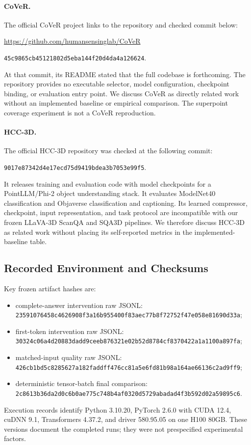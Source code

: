 \paragraph{CoVeR.} The official CoVeR project links to the repository and checked commit below:
{\raggedright\par\noindent
\url{https://github.com/humansensinglab/CoVeR}\par\noindent
\texttt{45c9865cb45121802d5e\allowbreak ba144f20d4da4a126624}.\par}
At that commit, its README stated that the full codebase is forthcoming. The repository provides no executable selector, model configuration, checkpoint binding, or evaluation entry point. We discuss CoVeR as directly related work without an implemented baseline or empirical comparison. The superpoint coverage experiment is not a CoVeR reproduction.

\paragraph{HCC-3D.} The official HCC-3D repository was checked at the following commit:
{\raggedright\par\noindent
\texttt{9017e87342d4e17ecd75\allowbreak d9419bdea3b7053e99f5}.\par}
It releases training and evaluation code with model checkpoints for a PointLLM/Phi-2 object understanding stack. It evaluates ModelNet40 classification and Objaverse classification and captioning. Its learned compressor, checkpoint, input representation, and task protocol are incompatible with our frozen LLaVA-3D ScanQA and SQA3D pipelines. We therefore discuss HCC-3D as related work without placing its self-reported metrics in the implemented-baseline table.

\subsection{Recorded Environment and Checksums}
Key frozen artifact hashes are:

\begin{itemize}
\item complete-answer intervention raw JSONL: \texttt{23591076458c4626}\allowbreak \texttt{908f3a16b955400f}\allowbreak \texttt{83aec77b8f72752f}\allowbreak \texttt{47e058e81690d33a};
\item first-token intervention raw JSONL: \texttt{30324c06a4d20883}\allowbreak \texttt{dadd9ceeb876321e}\allowbreak \texttt{02b52d8784cf8370}\allowbreak \texttt{422a1a1100a897fa};
\item matched-input quality raw JSONL: \texttt{426cb1bd5c828562}\allowbreak \texttt{7a182faddff476cc}\allowbreak \texttt{81a5e6fd81b98a16}\allowbreak \texttt{4ae66136c2ad9ff9};
\item deterministic tensor-batch final comparison: \texttt{2c8613b36da2d0c6}\allowbreak \texttt{b0ae775c748b4af0}\allowbreak \texttt{320d5729abadad4f}\allowbreak \texttt{3b592d02a59895c6}.
\end{itemize}

Execution records identify Python 3.10.20, PyTorch 2.6.0 with CUDA 12.4, cuDNN 9.1, Transformers 4.37.2, and driver 580.95.05 on one H100 80GB. These versions document the completed runs; they were not prespecified experimental factors.
